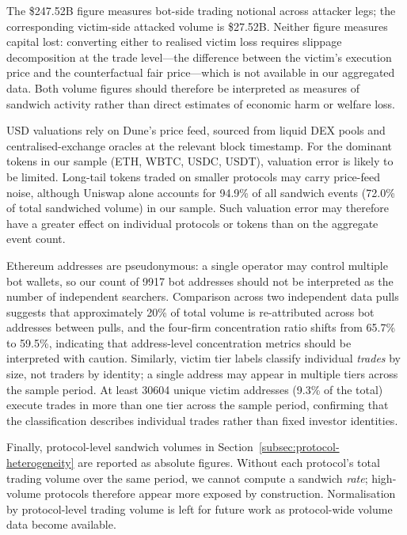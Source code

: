 \documentclass[pdflatex, sn-basic]{sn-jnl}
\theoremstyle{thmstylethree}%
\begin{document}
    The \$\num{247.52}B figure measures bot-side trading notional across attacker legs; the corresponding victim-side attacked volume is \$\num{27.52}B.
    Neither figure measures capital lost: converting either to realised victim loss requires slippage decomposition at the trade level---the difference between the victim's execution price and the counterfactual fair price---which is not available in our aggregated data.
    Both volume figures should therefore be interpreted as measures of sandwich activity rather than direct estimates of economic harm or welfare loss.
    
    USD valuations rely on Dune's price feed, sourced from liquid \ac{DEX} pools and centralised-exchange oracles at the relevant block timestamp.
    For the dominant tokens in our sample (ETH, WBTC, USDC, USDT), valuation error is likely to be limited.
    Long-tail tokens traded on smaller protocols may carry price-feed noise, although Uniswap alone accounts for \num{94.9}\% of all sandwich events (\num{72.0}\% of total sandwiched volume) in our sample.
    Such valuation error may therefore have a greater effect on individual protocols or tokens than on the aggregate event count.
    
    Ethereum addresses are pseudonymous: a single operator may control multiple bot wallets, so our count of \num{9917} bot addresses should not be interpreted as the number of independent searchers.
    Comparison across two independent data pulls suggests that approximately \num{20}\% of total volume is re-attributed across bot addresses between pulls, and the four-firm concentration ratio shifts from \num{65.7}\% to \num{59.5}\%, indicating that address-level concentration metrics should be interpreted with caution.
    Similarly, victim tier labels classify individual \emph{trades} by size, not traders by identity; a single address may appear in multiple tiers across the sample period.
    At least \num{30604} unique victim addresses (\num{9.3}\% of the total) execute trades in more than one tier across the sample period, confirming that the classification describes individual trades rather than fixed investor identities.
    
    Finally, protocol-level sandwich volumes in Section~\ref{subsec:protocol-heterogeneity} are reported as absolute figures.
    Without each protocol's total trading volume over the same period, we cannot compute a sandwich \emph{rate}; high-volume protocols therefore appear more exposed by construction.
    Normalisation by protocol-level trading volume is left for future work as protocol-wide volume data become available.
\end{document}
